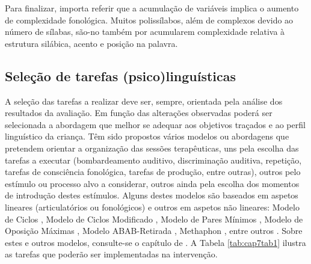 \documentclass[output=paper,colorlinks,citecolor=brown,booklanguage=portuguese]{langscibook}
\begin{document}
Para finalizar, importa referir que a acumulação de variáveis implica o aumento de complexidade fonológica. Muitos polissílabos, além de complexos devido ao número de sílabas, são-no também por acumularem complexidade relativa à estrutura silábica, acento e posição na palavra. 

\subsection{Seleção de tarefas (psico)linguísticas}

A seleção das tarefas a realizar deve ser, sempre, orientada pela análise dos resultados da avaliação. Em função das alterações observadas poderá ser selecionada a abordagem que melhor se adequar aos objetivos traçados e ao perfil linguístico da criança. Têm sido propostos vários modelos ou abordagens que pretendem orientar a organização das sessões terapêuticas, uns pela escolha das tarefas a executar (bombardeamento auditivo, discriminação auditiva, repetição, tarefas de consciência fonológica, tarefas de produção, entre outras), outros pelo estímulo ou processo alvo a considerar, outros ainda pela escolha dos momentos de introdução destes estímulos. Alguns destes modelos são baseados em aspetos lineares (articulatórios ou fonológicos) e outros em aspetos não lineares: Modelo de Ciclos \citep{Hodson2006}, Modelo de Ciclos Modificado \citep{Bagetti2005} , Modelo de Pares Mínimos \citep{Weiner1981}, Modelo de Oposição Máximas \citep{Gierut1989}, Modelo ABAB-Retirada  \citep{Tyler1994}, Methaphon \citep{Dean1986}, entre outros \citep{Mota2001}. Sobre estes e outros modelos, consulte-se o capítulo de .  A Tabela \ref{tab:cap7tab1} ilustra as tarefas que poderão ser implementadas na intervenção.
\end{document}

